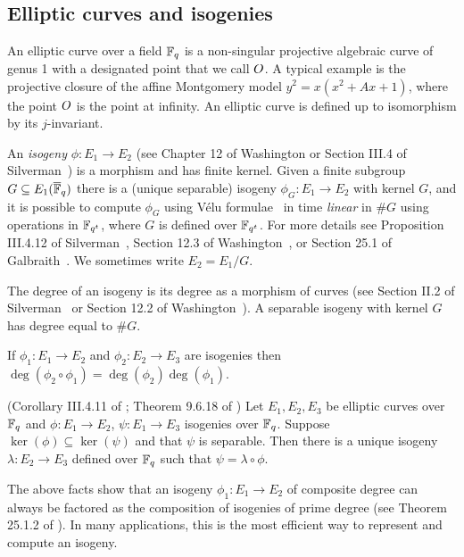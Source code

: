 \subsection{Elliptic curves and isogenies}
\label{sec:EC-and-isogeny}

An elliptic curve over a field $\mathbb{F}_q$ is a non-singular projective algebraic curve of genus 1 with a designated point that we call $O$. A typical example is the projective closure of the affine Montgomery model $y^2 = x(x^2 + Ax  + 1)$, where the point $O$ is the point at infinity.
An elliptic curve is defined up to isomorphism by its $j$-invariant.

An \emph{isogeny} $\phi : E_1 \to E_2$ (see Chapter 12 of Washington \cite{Was08} or Section III.4 of Silverman~\cite{Silverman}) is a morphism and has finite kernel. 
Given a finite subgroup $G \subseteq E_1( \overline{\mathbb{F}}_q )$ there is a (unique separable) isogeny $\phi_G : E_1 \to E_2$ with kernel $G$, and it is possible to compute $\phi_G$ using V{\' e}lu formulae~\cite{Velu} in time \emph{linear} in $\#G$ using operations in $\mathbb{F}_{q^t}$, where $G$ is defined over $\mathbb{F}_{q^t}$.
For more details see Proposition III.4.12 of Silverman~\cite{Silverman}, Section 12.3 of Washington~\cite{Was08}, or Section 25.1 of Galbraith~\cite{Gal12}.
We sometimes write $E_2 = E_1 / G$. %



The degree of an isogeny is its degree as a morphism of curves (see Section II.2 of Silverman~\cite{Silverman} or Section 12.2 of Washington~\cite{Was08}).
A separable isogeny with kernel $G$ has degree equal to $\#G$.

If $\phi_1 : E_1 \rightarrow E_2$
and $\phi_2 : E_2 \rightarrow E_3$ are isogenies then
$\deg( \phi_2 \circ \phi_1 ) = \deg( \phi_2 ) \deg( \phi_1 )$.



\begin{theorem} 
(Corollary III.4.11 of \cite{Silverman}; Theorem 9.6.18 of \cite{Gal12})
Let $E_1, E_2, E_3$ be elliptic curves over $\mathbb{F}_q$
and $\phi : E_1 \rightarrow E_2$, $\psi : E_1 \rightarrow E_3$
isogenies over $\mathbb{F}_q$. Suppose $\ker(\phi) \subseteq \ker( \psi )$ and
that $\psi$ is separable.
Then there is a unique isogeny $\lambda : E_2 \rightarrow E_3$
defined over $\mathbb{F}_q$ such that $\psi = \lambda \circ \phi$.
\end{theorem}

The above facts show that an isogeny $\phi_1 : E_1 \rightarrow E_2$ of composite degree can always be factored as the composition of isogenies of prime degree (see Theorem 25.1.2 of \cite{Gal12}). In many applications, this is the most efficient way to represent and compute an isogeny.


